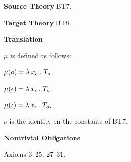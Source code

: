 \begin{thymorphism}[BT7-to-BT8]\em
\be

  \item[]

  \item[] \textbf{Source Theory} BT7.

  \item[] \textbf{Target Theory} BT8.

  \item[] \textbf{Translation} 

  \bi

    \item[] $\mu$ is defined as follows:

    \bi

      \item[] $\mu(o) = \lambda\, x_o \mathrel. T_o$.

      \item[] $\mu(\epsilon) = \lambda\, x_\epsilon \mathrel. T_o$.

      \item[] $\mu(\iota) = \lambda\, x_\iota \mathrel. T_o$.

    \ei

    $\nu$ is the identity on the constants of BT7.

  \ei

  \item[] \textbf{Nontrivial Obligations} 

  \bi

    \item[] Axioms 3--25, 27--31.

  \ei  

\ee
\end{thymorphism}
